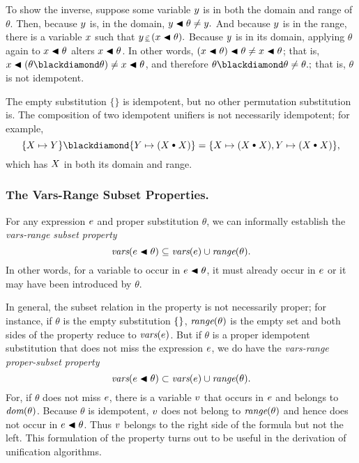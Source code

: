 \documentclass[runningheads]{llncs}
\begin{document}
 To show the inverse, suppose some variable $y$ is in both the domain and range of $\theta$. Then, because  $y$ is, in the domain, $y \blacktriangleleft \theta \neq y.$  And because $y$ is in the range, there is a variable $x$ such that $y \, \underline{\varepsilon} \, (x \blacktriangleleft \theta).$  Because $y$ is in its domain, applying $\theta$ again to $x \blacktriangleleft \theta$ alters $x \blacktriangleleft \theta$.  In other words, $(x \blacktriangleleft \theta) \blacktriangleleft \theta \neq x \blacktriangleleft \theta$;  that is, $\var{x} \apply (\theta \compose \theta) \neq \var{x} \apply \theta$, and therefore $\theta \compose \theta \neq \theta.;$  that is, $\theta$ is not idempotent.
 
 
 
 The empty substitution $\{\}$ is idempotent, but no other permutation substitution is.   The composition of two idempotent unifiers is not necessarily idempotent;  for example, \[\{\var{X} \mapsto \var{Y}\} \compose \{\var{Y} \mapsto (\var{X} {\cons} \var{X})\} = \{\var{X} \mapsto (\var{X} {\cons} \var{X}),\var{Y} \mapsto (\var{X} {\cons} \var{X})\},\] which has $X$ in both its domain and range.
 
 
\subsubsection{The Vars-Range Subset Properties.} For any expression $e$ and proper substitution $\theta$, we can informally establish the \emph{vars-range subset property}
\[\emph{vars}(e \blacktriangleleft \theta) \subseteq \emph{vars}(e) \cup \emph{range}(\theta).\]
In other words, for a variable to occur in $e \blacktriangleleft \theta $, it must already occur in $e$ or it may have been introduced by $\theta.$

In general, the subset relation in the property is not necessarily proper; for instance, if $\theta$ is the empty substitution $\{\}$, $\emph{range}(\theta)$ is the empty set and both sides of the property reduce to $\emph{vars}(e)$.  But if $\theta$ is a proper idempotent substitution that does not miss the expression $e$, we do have the \emph{vars-range proper-subset property}
\[\emph{vars}(e \blacktriangleleft \theta) \subset \emph{vars}(e) \cup \emph{range}(\theta).\]
For, if $\theta$ does not miss $e$, there is a variable $v$ that occurs in $e$ and belongs to $\emph{dom}(\theta)$.  Because $\theta$ is idempotent, $v$ does not belong to $\emph{range}(\theta)$ and hence does not occur in $e \blacktriangleleft \theta$.  Thus $v$ belongs to the right side of the formula but not the left.
This formulation of the property turns out to be useful in the derivation of unification algorithms.
 
\end{document}
